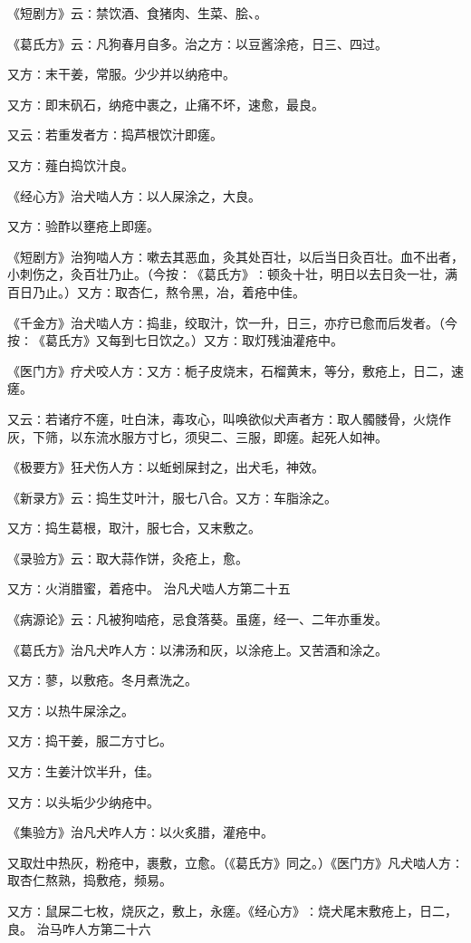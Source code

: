 \documentclass[a4paper,12pt,UTF8,twoside]{ctexbook}
\begin{document}
《短剧方》云∶禁饮酒、食猪肉、生菜、脍、。

《葛氏方》云∶凡狗春月自多。治之方∶以豆酱涂疮，日三、四过。

又方∶末干姜，常服。少少并以纳疮中。

又方∶即末矾石，纳疮中裹之，止痛不坏，速愈，最良。

又云∶若重发者方∶捣芦根饮汁即瘥。

又方∶薤白捣饮汁良。

《经心方》治犬啮人方∶以人屎涂之，大良。

又方∶验酢以壅疮上即瘥。

《短剧方》治狗啮人方∶嗽去其恶血，灸其处百壮，以后当日灸百壮。血不出者，小刺伤之，灸百壮乃止。（今按∶《葛氏方》∶顿灸十壮，明日以去日灸一壮，满百日乃止。）又方∶取杏仁，熬令黑，冶，着疮中佳。

《千金方》治犬啮人方∶捣韭，绞取汁，饮一升，日三，亦疗已愈而后发者。（今按∶《葛氏方》又每到七日饮之。）又方∶取灯残油灌疮中。

《医门方》疗犬咬人方∶又方∶栀子皮烧末，石榴黄末，等分，敷疮上，日二，速瘥。

又云∶若诸疗不瘥，吐白沫，毒攻心，叫唤欲似犬声者方∶取人髑髅骨，火烧作灰，下筛，以东流水服方寸匕，须臾二、三服，即瘥。起死人如神。

《极要方》狂犬伤人方∶以蚯蚓屎封之，出犬毛，神效。

《新录方》云∶捣生艾叶汁，服七八合。又方∶车脂涂之。

又方∶捣生葛根，取汁，服七合，又末敷之。

《录验方》云∶取大蒜作饼，灸疮上，愈。

又方∶火消腊蜜，着疮中。
治凡犬啮人方第二十五

《病源论》云∶凡被狗啮疮，忌食落葵。虽瘥，经一、二年亦重发。

《葛氏方》治凡犬咋人方∶以沸汤和灰，以涂疮上。又苦酒和涂之。

又方∶蓼，以敷疮。冬月煮洗之。

又方∶以热牛屎涂之。

又方∶捣干姜，服二方寸匕。

又方∶生姜汁饮半升，佳。

又方∶以头垢少少纳疮中。

《集验方》治凡犬咋人方∶以火炙腊，灌疮中。

又取灶中热灰，粉疮中，裹敷，立愈。（《葛氏方》同之。）《医门方》凡犬啮人方∶取杏仁熬熟，捣敷疮，频易。

又方∶鼠屎二七枚，烧灰之，敷上，永瘥。《经心方》∶烧犬尾末敷疮上，日二，良。
治马咋人方第二十六
\end{document}
